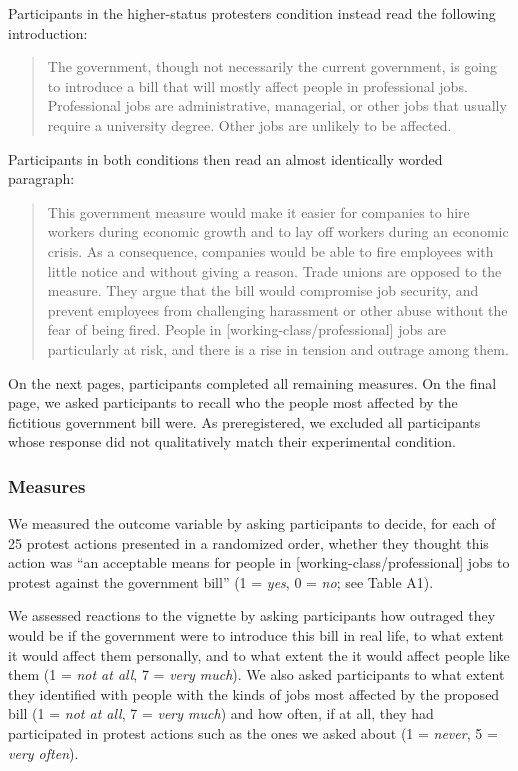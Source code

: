 \documentclass[twocolumn, 11pt, letterpaper]{article}
\begin{document}
\noindent Participants in the higher-status protesters condition instead
read the following introduction:

\begin{quote}
The government, though not necessarily the current government, is going
to introduce a bill that will mostly affect people in professional jobs.
Professional jobs are administrative, managerial, or other jobs that
usually require a university degree. Other jobs are unlikely to be
affected.
\end{quote}

\noindent Participants in both conditions then read an almost
identically worded paragraph:

\begin{quote}
This government measure would make it easier for companies to hire
workers during economic growth and to lay off workers during an economic
crisis. As a consequence, companies would be able to fire employees with
little notice and without giving a reason. Trade unions are opposed to
the measure. They argue that the bill would compromise job security, and
prevent employees from challenging harassment or other abuse without the
fear of being fired. People in {[}working-class/professional{]} jobs are
particularly at risk, and there is a rise in tension and outrage among
them.
\end{quote}

On the next pages, participants completed all remaining measures. On the
final page, we asked participants to recall who the people most affected
by the fictitious government bill were. As preregistered, we excluded
all participants whose response did not qualitatively match their
experimental condition.

\hypertarget{measures}{%
\subsubsection{Measures}\label{measures}}

We measured the outcome variable by asking participants to decide, for
each of 25 protest actions presented in a randomized order, whether they
thought this action was ``an acceptable means for people in
{[}working-class/professional{]} jobs to protest against the government
bill'' (1 = \emph{yes}, 0 = \emph{no}; see Table A1).

We assessed reactions to the vignette by asking participants how
outraged they would be if the government were to introduce this bill in
real life, to what extent it would affect them personally, and to what
extent the it would affect people like them (1 = \emph{not at all}, 7 =
\emph{very much}). We also asked participants to what extent they
identified with people with the kinds of jobs most affected by the
proposed bill (1 = \emph{not at all}, 7 = \emph{very much}) and how
often, if at all, they had participated in protest actions such as the
ones we asked about (1 = \emph{never}, 5 = \emph{very often}).
\end{document}
